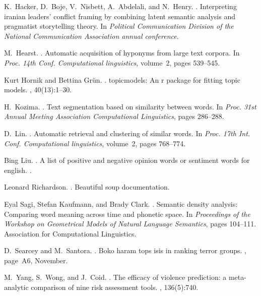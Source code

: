 \documentclass[11pt]{article}
\begin{document}
\begin{thebibliography}{}
K.~Hacker, D.~Boje, V.~Nisbett, A.~Abdelali, and N.~Henry.
.
\newblock Interpreting iranian leaders' conflict framing by combining latent
  semantic analysis and pragmatist storytelling theory.
\newblock In {\em Political Communication Division of the National
  Communication Association annual conference}.

M.~Hearst.
.
\newblock Automatic acquisition of hyponyms from large text corpora.
\newblock In {\em Proc. 14th Conf. Computational linguistics}, volume~2, pages
  539--545.

Kurt Hornik and Bettina Gr{\"u}n.
.
\newblock topicmodels: An r package for fitting topic models.
, 40(13):1--30.

H.~Kozima.
.
\newblock Text segmentation based on similarity between words.
\newblock In {\em Proc. 31st Annual Meeting Association Computational
  Linguistics}, pages 286--288.

D.~Lin.
.
\newblock Automatic retrieval and clustering of similar words.
\newblock In {\em Proc. 17th Int. Conf. Computational linguistics}, volume~2,
  pages 768--774.

Bing Liu.
.
\newblock A list of positive and negative opinion words or sentiment words for
  english.
\newblock {\em l{\'\i}nea]. Disponible en: http://www. cs. uic. edu/\~{}
  liub/.[{\'U}ltimo acceso: Junio 2015]}.

Leonard Richardson.
.
\newblock Beautiful soup documentation.

Eyal Sagi, Stefan Kaufmann, and Brady Clark.
.
\newblock Semantic density analysis: Comparing word meaning across time and
  phonetic space.
\newblock In {\em Proceedings of the Workshop on Geometrical Models of Natural
  Language Semantics}, pages 104--111. Association for Computational
  Linguistics.

D.~Searcey and M.~Santora.
.
\newblock Boko haram tops isis in ranking terror groups.
, page~A6, November.

M.~Yang, S.~Wong, and J.~Coid.
.
\newblock The efficacy of violence prediction: a meta-analytic comparison of
  nine risk assessment tools.
, 136(5):740.

\end{thebibliography}
\end{document}
